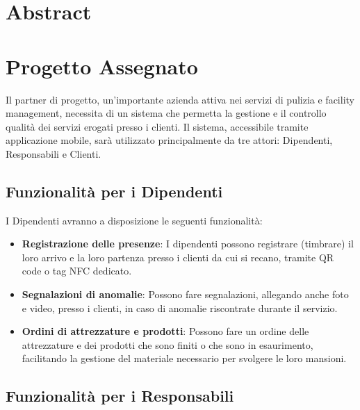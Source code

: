 \documentclass[twoside]{supsistudent}
\begin{document}
\maketitle
\onehalfspacing
\frontmatter


\tableofcontents
\listoffigures					%
\listoftables					%

\newpage
\mainmatter
{}
\setcounter{page}{1}

\chapter*{Abstract}

\chapter{Progetto Assegnato}

Il partner di progetto, un'importante azienda attiva nei servizi di pulizia e facility management, necessita di un sistema che permetta la gestione e il controllo qualità dei servizi erogati presso i clienti. Il sistema, accessibile tramite applicazione mobile, sarà utilizzato principalmente da tre attori: Dipendenti, Responsabili e Clienti.

\section{Funzionalità per i Dipendenti}

I Dipendenti avranno a disposizione le seguenti funzionalità:
\begin{itemize}
  \item \textbf{Registrazione delle presenze}: I dipendenti possono registrare (timbrare) il loro arrivo e la loro partenza presso i clienti da cui si recano, tramite QR code o tag NFC dedicato.
  \item \textbf{Segnalazioni di anomalie}: Possono fare segnalazioni, allegando anche foto e video, presso i clienti, in caso di anomalie riscontrate durante il servizio.
  \item \textbf{Ordini di attrezzature e prodotti}: Possono fare un ordine delle attrezzature e dei prodotti che sono finiti o che sono in esaurimento, facilitando la gestione del materiale necessario per svolgere le loro mansioni.
\end{itemize}

\section{Funzionalità per i Responsabili}
\end{document}

